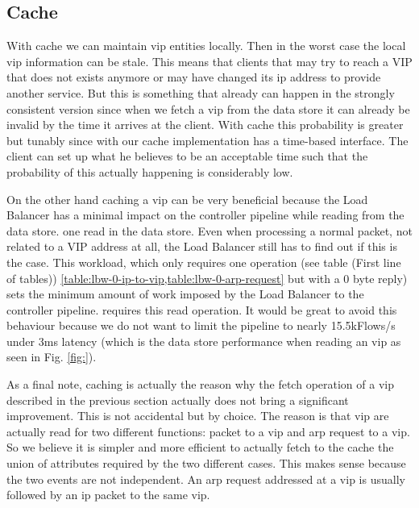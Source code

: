 \documentclass[12pt,openright,twoside]{report}
\begin{document}
\subsection{Cache}
With cache  we can maintain \gls{vip} entities locally. Then in the worst case the local \gls{vip} information can be stale.
This means that  clients that may try to reach a VIP that does not exists anymore or may have changed its \gls{ip}  address to provide another service. 
But this is something that already can happen in the strongly consistent version since when we fetch a \gls{vip} from the data store it can already be invalid by the time it arrives at the client. 
With cache this probability is greater but tunably  since with our cache implementation has a time-based interface. 
The client can set up what he believes to be an acceptable time such that the probability of this actually happening is considerably low. 


On the other hand caching a \gls{vip} can be very beneficial because the Load Balancer has a minimal impact on the controller pipeline while reading from the data store. 
one read in the data store. Even when processing a normal packet, not related to a VIP address at
all, the Load Balancer still has to find out if this is the case. This
workload, which only requires one operation (see table (First line of tables))
\ref{table:lbw-0-ip-to-vip,table:lbw-0-arp-request} but with  a 0 byte
reply) sets the minimum amount of work imposed by
the Load Balancer to the controller pipeline. 
requires this read operation. It would be great to avoid this
behaviour because we do not want to limit the pipeline to nearly 15.5kFlows/s
under 3ms latency (which is the data store performance when reading an
\gls{vip} as seen in Fig. \ref{fig:}). 




As a final note, caching is actually the reason why the fetch
operation of a \gls{vip} described in the previous section actually
does not bring a significant improvement. This is not accidental but
by choice. The reason is that \gls{vip} are actually read for two
different functions: packet to a vip and arp request to a vip. So we
believe it is simpler and more efficient to actually fetch to the
cache the union of attributes required by the two different
cases. This makes sense because the two events are not independent. An
\gls{arp} request addressed at a \gls{vip} is usually followed by an
\gls{ip} packet to the same \gls{vip}.  
\end{document}
